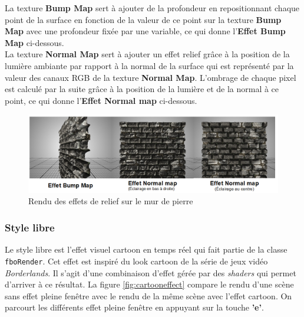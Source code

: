 La texture \textbf{Bump Map} sert à ajouter de la profondeur en repositionnant chaque point de la surface en fonction de la valeur de ce point sur la texture \textbf{Bump Map} avec une profondeur fixée par une variable, ce qui donne l'\textbf{Effet Bump Map} ci-dessous. \\

La texture \textbf{Normal Map} sert à ajouter un effet relief grâce à la position de la lumière ambiante par rapport à la normal de la surface qui est représenté par la valeur des canaux RGB de la texture \textbf{Normal Map}. L'ombrage de chaque pixel est calculé par la suite grâce à la position de la lumière et de la normal à ce point, ce qui donne l'\textbf{Effet Normal map} ci-dessous.

\begin{figure}[H]
    \centering
	\includegraphics[scale=0.62]{img/infog-image-rendu-mur-pierre.png}
	\caption{Rendu des effets de relief sur le mur de pierre}
	\label{fig:wallnormalbumprender}
\end{figure}

\subsubsection{Style libre}

Le style libre est l'effet visuel cartoon en temps réel qui fait partie de la classe \texttt{fboRender}.
Cet effet est inspiré du look cartoon de la série de jeux vidéo \emph{Borderlands}.
Il s'agit d'une combinaison d'effet gérée par des \textit{shaders} qui permet d'arriver à ce résultat.
La figure \ref{fig:cartooneffect} compare le rendu d'une scène sans effet pleine fenêtre avec le rendu de la même scène avec l'effet cartoon.
On parcourt les différents effet pleine fenêtre en appuyant sur la touche \textbf{'e'}.\\

